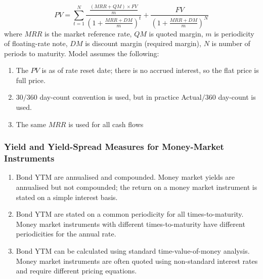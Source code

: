 \begin{definition} 
\begin{equation}
PV = \sum\limits_{t=1}^N \frac{\frac{(MRR + QM) \times FV}{m}}{\left(1 + \frac{MRR + DM}{m} \right)^t} + \frac{FV}{\left(1 + \frac{MRR + DM}{m} \right)^N} \nonumber
\end{equation}
where $MRR$ is the market reference rate, $QM$ is quoted margin, $m$ is periodicity of floating-rate note, $DM$ is discount margin (required margin), $N$ is number of periods to maturity. Model assumes the following:
\begin{enumerate}[label=\roman*.]
\setlength{\itemsep}{0pt}
\item The $PV$ is as of rate reset date; there is no accrued interest, so the flat price is full price.
\item $30/360$ day-count convention is used, but in practice Actual$/360$ day-count is used.
\item The same $MRR$ is used for all cash flows
\end{enumerate}
\end{definition}

\subsubsection{Yield and Yield-Spread Measures for Money-Market Instruments}

\begin{remark} 
\begin{enumerate}[label=\roman*.]
\setlength{\itemsep}{0pt}
\item Bond YTM are annualised and compounded. Money market yields are annualised but not compounded; the return on a money market instrument is stated on a simple interest basis.
\item Bond YTM are stated on a common periodicity for all times-to-maturity. Money market instruments with different times-to-maturity have different periodicities for the annual rate.
\item Bond YTM can be calculated using standard time-value-of-money analysis. Money market instruments are often quoted using non-standard interest rates and require different pricing equations.
\end{enumerate}
\end{remark}

